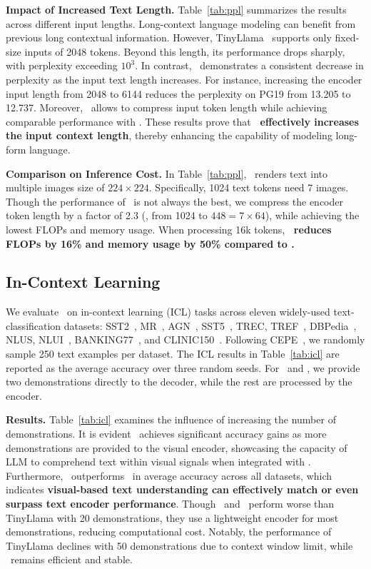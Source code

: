\noindent\textbf{Impact of Increased Text Length.}
Table~\ref{tab:ppl} summarizes the results across different input lengths.
Long-context language modeling can benefit from previous long contextual information. 
However, TinyLlama~\cite{zhang2024tinyllama} supports only fixed-size inputs of 2048 tokens. Beyond this length, its performance drops sharply, with perplexity exceeding $10^3$. 
In contrast, \ourname\ demonstrates a consistent decrease in perplexity as the input text length increases. 
For instance, increasing the encoder input length from 2048 to 6144 reduces the perplexity on PG19 from 13.205 to 12.737. 
Moreover, \ourname\ allows to compress input token length while achieving comparable performance with \mytext. 
These results prove that \textbf{ \ourname\ effectively increases the input context length}, thereby enhancing the capability of modeling long-form language.


\noindent\textbf{Comparison on Inference Cost.} 
In Table~\ref{tab:ppl}, \ourname\ renders text into multiple images size of $224\times224$. 
Specifically, 1024 text tokens need 7 images. 
Though the performance of \ourname\ is not always the best, we compress the encoder token length by a factor of 2.3 (\eg, from 1024 to $448=7\times64$), while achieving the lowest FLOPs and memory usage. When processing 16k tokens, \textbf{\ourname\ reduces FLOPs by 16\% and memory usage by 50\% compared to \mytext.}





\subsection{In-Context Learning}
We evaluate \ourname\ on in-context learning (ICL) tasks across eleven widely-used text-classification datasets: SST2~\cite{socher2013recursive}, MR~\cite{pang2005seeing}, AGN~\cite{zhang2015character}, SST5~\cite{socher2013recursive}, TREC, TREF~\cite{voorhees2000building}, 
 DBPedia~\cite{zhang2015character}, NLUS, NLUI~\cite{liu2021benchmarking}, 
BANKING77~\cite{casanueva2020efficient}, and CLINIC150~\cite{larson2019evaluation}. Following CEPE~\cite{yen2024long}, we randomly sample 250 text examples per dataset. The ICL results in Table~\ref{tab:icl} are reported as the average accuracy over three random seeds. For \ourname\ and \mytext, we provide two demonstrations directly to the decoder, while the rest are processed by the encoder. 


\noindent\textbf{Results.} 
Table~\ref{tab:icl} examines the influence of increasing the number of demonstrations. 
It is evident \ourname\ achieves significant accuracy gains as more demonstrations are provided to the visual encoder, showcasing the capacity of LLM to comprehend text within visual signals when integrated with \ourname. 
Furthermore, \ourname\ outperforms \mytext\ in average accuracy across all datasets, which indicates \textbf{visual-based text understanding can effectively match or even surpass text encoder performance}. 
Though \ourname\ and \mytext\ perform worse than TinyLlama with 20 demonstrations, they use a lightweight encoder for most demonstrations, reducing computational cost. 
Notably, the performance of TinyLlama declines with 50 demonstrations due to context window limit, while \ourname\ remains efficient and stable.
